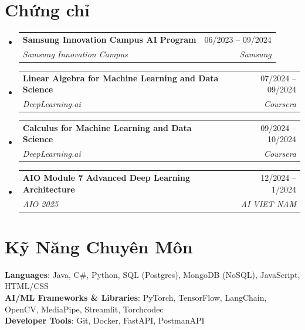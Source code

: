 \documentclass[letterpaper,11pt]{article}
\makeatletter
\newcommand{\resumeSubheading}[4]{
	\vspace{-2pt}\item
	\begin{tabular*}{0.97\textwidth}[t]{l@{\extracolsep{\fill}}r}
		\textbf{#1} & #2 \\
		\textit{\small#3} & \textit{\small #4} \\
	\end{tabular*}\vspace{-7pt}
}
\newcommand{\resumeSubHeadingListStart}{\begin{itemize}[leftmargin=0.15in, label={}]}
\newcommand{\resumeSubHeadingListEnd}{\end{itemize}}
\makeatother
\begin{document}
\section{Chứng chỉ}
	\resumeSubHeadingListStart
		\resumeSubheading
			{Samsung Innovation Campus AI Program}{06/2023 -- 09/2024}
			{Samsung Innovation Campus}{Samsung}

		\resumeSubheading
			{Linear Algebra for Machine Learning and Data Science}{07/2024 -- 09/2024}
			{DeepLearning.ai}{Coursera}

		\resumeSubheading
			{Calculus for Machine Learning and Data Science} {09/2024 -- 10/2024}
			{DeepLearning.ai}{Coursera}

		\resumeSubheading
			{AIO Module 7 Advanced Deep Learning Architecture} {12/2024 -- 1/2024}
			{AIO 2025}{AI VIET NAM}

	\resumeSubHeadingListEnd

\section{Kỹ Năng Chuyên Môn}
\textbf{Languages}{: Java, C\#, Python, SQL (Postgres), MongoDB (NoSQL), JavaScript, HTML/CSS} \\
\textbf{AI/ML Frameworks \& Libraries}{: PyTorch, TensorFlow, LangChain, OpenCV, MediaPipe, Streamlit, Torchcodec} \\
\textbf{Developer Tools}{: Git, Docker, FastAPI, PostmanAPI} \\
\end{document}
